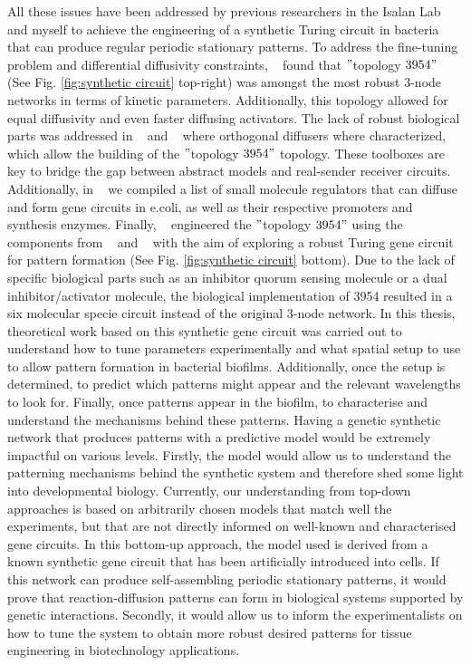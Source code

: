 All these issues have been addressed by previous researchers in the Isalan Lab and myself to achieve the engineering of a synthetic Turing circuit in bacteria that can produce regular periodic stationary patterns.
To address the fine-tuning problem and differential diffusivity constraints, ~\cite{Scholes2019} found that \("\)topology \(3954"\) (See Fig. \ref{fig:synthetic circuit} top-right) was amongst the most robust 3-node networks in terms of kinetic parameters.
Additionally, this topology allowed for equal diffusivity and even faster diffusing activators.
The lack of robust biological parts was addressed in ~\cite{Meyer2019} and ~\cite{Du2020} where orthogonal diffusers where characterized, which allow the building of the \("\)topology \(3954"\) topology.
These toolboxes are key to bridge the gap between abstract models and real-sender receiver circuits.
Additionally, in ~\cite{huidobro} we compiled a list of small molecule regulators that can diffuse and form gene circuits in e.coli, as well as their respective promoters and synthesis enzymes.
Finally, ~\cite{Tica2020} engineered the \("\)topology \(3954"\) using the components from ~\cite{Meyer2019} and ~\cite{Du2020} with the aim of exploring a robust Turing gene circuit for pattern formation (See Fig. \ref{fig:synthetic circuit} bottom).
Due to the lack of specific biological parts such as an inhibitor quorum sensing molecule or a dual inhibitor/activator molecule, the biological implementation of 3954 resulted in a six molecular specie circuit instead of the original 3-node network. 
In this thesis, theoretical work based on this synthetic gene circuit was carried out to understand how to tune parameters experimentally and what spatial setup to use to allow pattern formation in bacterial biofilms.
Additionally, once the setup is determined, to predict which patterns might appear and the relevant wavelengths to look for.
Finally, once patterns appear in the biofilm, to characterise and understand the mechanisms behind these patterns.
Having a genetic synthetic network that produces patterns with a predictive model would be extremely impactful on various levels.
Firstly, the model would allow us to understand the patterning mechanisms behind the synthetic system and therefore shed some light into developmental biology.
Currently, our understanding from top-down approaches is based on arbitrarily chosen models that match well the experiments, but that are not directly informed on well-known and characterised gene circuits.
In this bottom-up approach, the model used is derived from a known synthetic gene circuit that has been artificially introduced into cells. %
If this network can produce self-assembling periodic stationary patterns, it would prove that reaction-diffusion patterns can form in biological systems supported by genetic interactions.
Secondly, it would allow us to inform the experimentalists on how to tune the system to obtain more robust desired patterns for tissue engineering in biotechnology applications.






